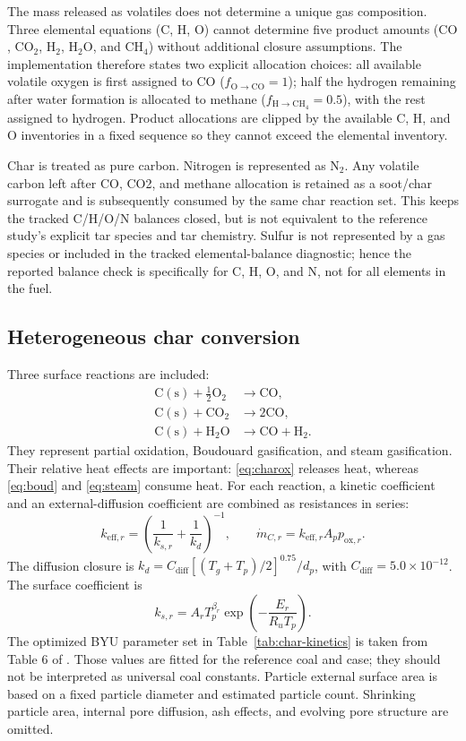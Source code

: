 \documentclass[journal]{IEEEtran}
\newcommand{\CO}{\mathrm{CO}}
\newcommand{\COtwo}{\mathrm{CO_2}}
\newcommand{\Htwo}{\mathrm{H_2}}
\newcommand{\HtwoO}{\mathrm{H_2O}}
\newcommand{\Otwo}{\mathrm{O_2}}
\newcommand{\CHfour}{\mathrm{CH_4}}
\newcommand{\Ntwo}{\mathrm{N_2}}
\begin{document}
The mass released as volatiles does not determine a unique gas composition. Three elemental equations (C, H, O) cannot determine five product amounts (\(\CO\), \(\COtwo\), \(\Htwo\), \(\HtwoO\), and \(\CHfour\)) without additional closure assumptions. The implementation therefore states two explicit allocation choices: all available volatile oxygen is first assigned to CO (\(f_{\mathrm{O}\rightarrow\mathrm{CO}}=1\)); half the hydrogen remaining after water formation is allocated to methane (\(f_{\mathrm{H}\rightarrow\mathrm{CH_4}}=0.5\)), with the rest assigned to hydrogen. Product allocations are clipped by the available C, H, and O inventories in a fixed sequence so they cannot exceed the elemental inventory.

Char is treated as pure carbon. Nitrogen is represented as \(\Ntwo\). Any volatile carbon left after CO, CO2, and methane allocation is retained as a soot/char surrogate and is subsequently consumed by the same char reaction set. This keeps the tracked C/H/O/N balances closed, but is not equivalent to the reference study's explicit tar species and tar chemistry. Sulfur is not represented by a gas species or included in the tracked elemental-balance diagnostic; hence the reported balance check is specifically for C, H, O, and N, not for all elements in the fuel.

\subsection{Heterogeneous char conversion}
Three surface reactions are included:
\begin{align}
\mathrm{C(s)}+\tfrac12\Otwo &\rightarrow \CO, \label{eq:charox}\\
\mathrm{C(s)}+\COtwo &\rightarrow 2\CO, \label{eq:boud}\\
\mathrm{C(s)}+\HtwoO &\rightarrow \CO+\Htwo. \label{eq:steam}
\end{align}
They represent partial oxidation, Boudouard gasification, and steam gasification. Their relative heat effects are important: \eqref{eq:charox} releases heat, whereas \eqref{eq:boud} and \eqref{eq:steam} consume heat. For each reaction, a kinetic coefficient and an external-diffusion coefficient are combined as resistances in series:
\begin{equation}
k_{\mathrm{eff},r}=\left(\frac{1}{k_{s,r}}+\frac{1}{k_d}\right)^{-1}, \qquad
\dot{m}_{C,r}=k_{\mathrm{eff},r}A_p p_{\mathrm{ox},r}.
\label{eq:char_rate}
\end{equation}
The diffusion closure is \(k_d=C_{\mathrm{diff}}[(T_g+T_p)/2]^{0.75}/d_p\), with \(C_{\mathrm{diff}}=5.0\times10^{-12}\). The surface coefficient is
\begin{equation}
k_{s,r}=A_rT_p^{\beta_r}\exp\left(-\frac{E_r}{R_uT_p}\right).
\end{equation}
The optimized BYU parameter set in Table~\ref{tab:char-kinetics} is taken from Table 6 of \cite{mularski2021}. Those values are fitted for the reference coal and case; they should not be interpreted as universal coal constants. Particle external surface area is based on a fixed particle diameter and estimated particle count. Shrinking particle area, internal pore diffusion, ash effects, and evolving pore structure are omitted.
\end{document}

